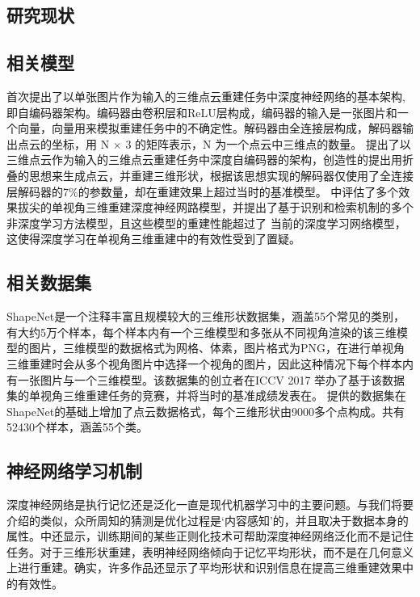 \documentclass[bachelor, nocolorlinks, printoneside]{seuthesis} %
\begin{document}
\begin{Main}
\section{研究现状}
\subsection{相关模型}
\cite{fan2017point}首次提出了以单张图片作为输入的三维点云重建任务中深度神经网络的基本架构, 即自编码器架构。编码器由卷积层和ReLU层构成，编码器的输入是一张图片和一个向量，向量用来模拟重建任务中的不确定性。解码器由全连接层构成，解码器输出点云的坐标，用 N × 3 的矩阵表示，N 为一个点云中三维点的数量。
\cite{yang2018foldingnet}提出了以三维点云作为输入的三维点云重建任务中深度自编码器的架构，创造性的提出用折叠的思想来生成点云，并重建三维形状，根据该思想实现的解码器仅使用了全连接层解码器的7\%的参数量，却在重建效果上超过当时的基准模型。
\cite{tatarchenko2019single}中评估了多个效果拔尖的单视角三维重建深度神经网路模型，并提出了基于识别和检索机制的多个非深度学习方法模型，且这些模型的重建性能超过了
当前的深度学习网络模型，这使得深度学习在单视角三维重建中的有效性受到了置疑。

\subsection{相关数据集}
ShapeNet\cite{chang2015shapenet}是一个注释丰富且规模较大的三维形状数据集，涵盖55个常见的类别，有大约5万个样本，每个样本内有一个三维模型和多张从不同视角渲染的该三维模型的图片，三维模型的数据格式为网格、体素，图片格式为PNG，在进行单视角三维重建时会从多个视角图片中选择一个视角的图片，因此这种情况下每个样本内有一张图片与一个三维模型。该数据集的创立者在ICCV 2017 举办了基于该数据集的单视角三维重建任务的竞赛，并将当时的基准成绩发表在\cite{Yi2017LargeScale3S}。
\cite{tatarchenko2019single}提供的数据集在ShapeNet\cite{chang2015shapenet}的基础上增加了点云数据格式，每个三维形状由9000多个点构成。共有52430个样本，涵盖55个类。
\subsection{神经网络学习机制}
深度神经网络是执行记忆还是泛化一直是现代机器学习中的主要问题。与我们将要介绍的类似，众所周知的猜测是优化过程是‘内容感知’的，并且取决于数据本身的属性\cite{arpit2017closer}。\cite{arpit2017closer}中还显示，训练期间的某些正则化技术可帮助深度神经网络泛化而不是记住任务。对于三维形状重建，\cite{tatarchenko2019single}表明神经网络倾向于记忆平均形状，而不是在几何意义上进行重建。确实，许多作品还显示了平均形状和识别信息在提高三维重建效果中的有效性\cite{kanazawa2018learning,pontes2018image2mesh,kurenkov2018deformnet}。


\end{Main}
\end{document}
